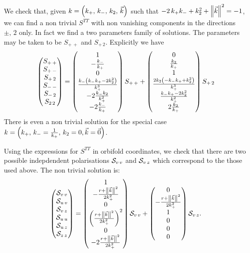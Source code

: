 We check that, given $k = \qty(k_+,\, k_-,\, k_2,\, \vec{k})$ such that $-2\, k_+ k_- + k_2^2 + \norm{\vec{k}}^2 = -1$, we can find a non trivial $S^{TT}$ with non vanishing components in the directions $\pm,\, 2$ only.
In fact we find a two parameters family of solutions.
The parameters may be taken to be $S_{+\, +}$ and $S_{+\, 2}$.
Explicitly we have
\begin{equation}
  \mqty(%
    S_{+\, +} \\
    S_{+\, -} \\
    S_{+\, 2} \\
    S_{-\, -} \\
    S_{-\, 2} \\
    S_{2\, 2}
  )
  =
  \mqty(%
    1 \\
    -\frac{k_-}{k_+} \\
    0 \\
    \frac{k_- \qty(k_- k_+ -2 k_2^2)}{k_+^3} \\
    -2 \frac{k_- k_2}{k_+^2} \\
    -2 \frac{k_-}{k_+}
  )\,
  S_{+\, +}
  +
  \mqty(%
    0 \\
    \frac{k_2}{k_+} \\
    1\\
    \frac{2 k_2 \qty(-k_- k_+ + k_2^2)} {k_+^3} \\
    \frac{k_- k_+ -2 k_2^2} {k_+^2} \\
    2 \frac{k_2}{k_+}
  )\,
  S_{+\, 2}
\end{equation}
There is even a non trivial solution for the special case $k = \qty(k_+,\, k_- = \frac{1}{k_+},\, k_2 = 0, \vec{k} = \vec{0})$.

Using the expressions for $S^{T T}$ in orbifold coordinates, we check that there are two possible indepdendent polarisations $\mathcal{S}_{v\, v}$ and $\mathcal{S}_{v\, z}$ which correspond to the those used above.
The non trivial solution is:
\begin{equation}
  \mqty(%
    \cS_{v\, v} \\
    \cS_{u\, v} \\
    \cS_{v\, z} \\
    \cS_{u\, u} \\
    \cS_{u\, z} \\
    \cS_{z\, z}       
  )
  =
  \mqty(%
    1 \\
    - \frac{r + \norm{\vec{k}}^2}{2 k_+^2} \\
    0 \\
    \qty( \frac{r + \norm{\vec{k}}^2}{2 k_+^2} )^2 \\
    0 \\
    -2 \frac{r + \norm{\vec{k}}^2}{2 k_+^2}
  )\,
  \cS_{v\, v}
  +
  \mqty(%
    0 \\
    -\frac{r + \norm{\vec{k}}^2}{2 k_+^2} \\
    1 \\
    0 \\ 0\\ 0\\
  )\,
  \cS_{v\, z}.
\end{equation}


